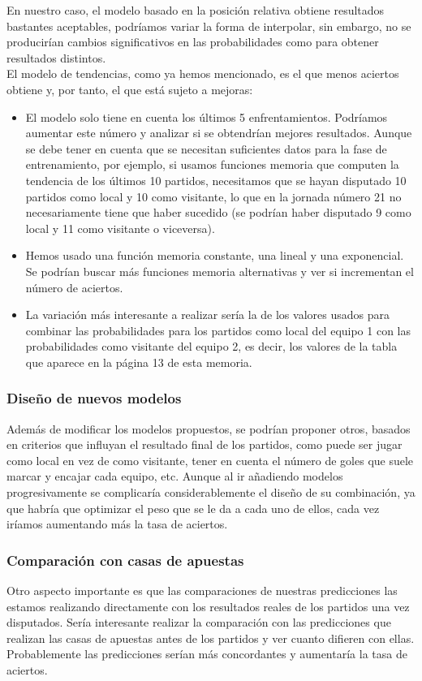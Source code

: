 En nuestro caso, el modelo basado en la posición relativa obtiene resultados bastantes aceptables, podríamos variar la forma de interpolar, sin embargo, no se producirían cambios significativos en las probabilidades como para obtener resultados distintos.\\

El modelo de tendencias, como ya hemos mencionado, es el que menos aciertos obtiene y, por tanto, el que está sujeto a mejoras:
\begin{itemize}
	\item El modelo solo tiene en cuenta los últimos 5 enfrentamientos. Podríamos aumentar este número y analizar si se obtendrían mejores resultados. Aunque se debe tener en cuenta que se necesitan suficientes datos para la fase de entrenamiento, por ejemplo, si usamos funciones memoria que computen la tendencia de los últimos 10 partidos, necesitamos que se hayan disputado 10 partidos como local y 10 como visitante, lo que en la jornada número 21 no necesariamente tiene que haber sucedido (se podrían haber disputado 9 como local y 11 como visitante o viceversa).
	\item Hemos usado una función memoria constante, una lineal y una exponencial. Se podrían buscar más funciones memoria alternativas y ver si incrementan el número de aciertos.
	\item La variación más interesante a realizar sería la de los valores usados para combinar las probabilidades para los partidos como local del equipo 1 con las probabilidades como visitante del equipo 2, es decir, los valores de la tabla que aparece en la página 13 de esta memoria.
\end{itemize}

\subsubsection*{Diseño de nuevos modelos}
Además de modificar los modelos propuestos, se podrían proponer otros, basados en criterios que influyan el resultado final de los partidos, como puede ser jugar como local en vez de como visitante, tener en cuenta el número de goles que suele marcar y encajar cada equipo, etc. 
Aunque al ir añadiendo modelos progresivamente se complicaría considerablemente el diseño de su combinación, ya que habría que optimizar el peso que se le da a cada uno de ellos, cada vez iríamos aumentando más la tasa de aciertos.\\

\subsubsection*{Comparación con casas de apuestas}
Otro aspecto importante es que las comparaciones de nuestras predicciones las estamos realizando directamente con los resultados reales de los partidos una vez disputados. Sería interesante realizar la comparación con las predicciones que realizan las casas de apuestas antes de los partidos y ver cuanto difieren con ellas. Probablemente las predicciones serían más concordantes y aumentaría la tasa de aciertos.
 
